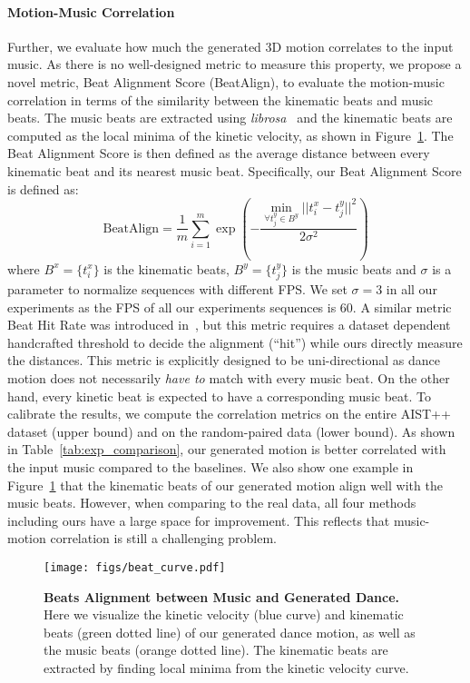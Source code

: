 \paragraph{Motion-Music Correlation} Further, we evaluate how much the generated 3D motion correlates to the input music. 
As there is no well-designed metric to measure this property, we propose a novel metric, Beat Alignment Score (BeatAlign), to evaluate the motion-music correlation in terms of the similarity between the kinematic beats and music beats.
The music beats are extracted using \emph{librosa}~\cite{mcfee2015librosa} and the kinematic beats are computed as the local minima of the kinetic velocity, as shown in Figure~\ref{fig:beat_curve}.
The Beat Alignment Score is then defined as the average distance between every kinematic beat and its nearest music beat. 
Specifically, our Beat Alignment Score is defined as:
\begin{equation}
    \text{BeatAlign} = \frac{1}{m}\sum_{i=1}^{m}{\exp(-\frac{\min_{\forall t_j^y \in B^y} ||t_i^x - t_j^y||^2}{2\sigma^2})}
\end{equation}
where $B^x=\{t_i^x\}$ is the kinematic beats, $B^y = \{t_j^y\}$ is the music beats and $\sigma$ is a parameter to normalize sequences with different FPS. 
We set $\sigma = 3$ in all our experiments as the FPS of all our experiments sequences is 60.
A similar metric Beat Hit Rate was introduced in~\cite{lee2019dance, huang2021}, but this metric requires a dataset dependent handcrafted threshold to decide the alignment (``hit'') while ours directly measure the distances. 
This metric is explicitly designed to be uni-directional as dance motion does not necessarily \emph{have to} match with every music beat. On the other hand, every kinetic beat is expected to have a corresponding music beat.
To calibrate the results, we compute the correlation metrics on the entire AIST++ dataset (upper bound) and on the random-paired data (lower bound).
As shown in Table~\ref{tab:exp_comparison}, our generated motion is better correlated with the input music compared to the baselines. We also show one example in Figure~\ref{fig:beat_curve} that the kinematic beats of our generated motion align well with the music beats.
However, when comparing to the real data, all four methods including ours have a large space for improvement. This reflects that music-motion correlation is still a challenging problem.

\begin{figure}[t]
\vspace{-5mm}
\centering
\texttt{[image: figs/beat\_curve.pdf]}
\vspace{-3mm}
\caption{\textbf{Beats Alignment between Music and Generated Dance.} Here we visualize the kinetic velocity (blue curve) and kinematic beats (green dotted line) of our generated dance motion, as well as the music beats (orange dotted line). The kinematic beats are extracted by finding local minima from the kinetic velocity curve.
}
\label{fig:beat_curve}
\vspace{-5mm}
\end{figure} 
\vspace{-3mm}
